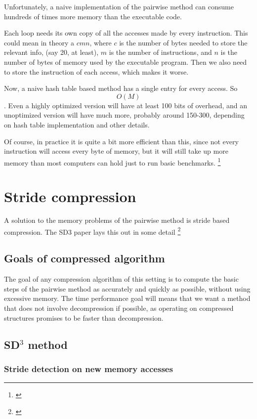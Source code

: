 \documentclass[12pt,twoside]{reedthesis}
\begin{document}
		Unfortunately, a naive implementation of the pairwise method can consume hundreds of times more memory than the executable code.

		Each loop needs its own copy of all the accesses made by every instruction. This could mean in theory a $cmn$, where $c$ is the number of bytes needed to store the relevant info, (say 20, at least), $m$ is the number of instructions, and $n$ is the number of bytes of memory used by the executable program. Then we also need to store the instruction of each access, which makes it worse.
		
		Now, a naive hash table based method has a single entry for every access. 
		So $$O(M)$$. Even a highly optimized version will have at least 100 bits of overhead, and an unoptimized version will have much more, probably around 150-300, depending on hash table implementation and other details. 

		Of course, in practice it is quite a bit more efficient than this, since not every instruction will access every byte of memory, but it will still take up more memory than most computers can hold just to run basic benchmarks. \footnote{\cite{Kim:2010}}

	\section{Stride compression}

		A solution to the memory problems of the pairwise method is stride based compression. The SD3 paper lays this out in some detail \footnote{\cite{Kim:2010}}

		\subsection{Goals of compressed algorithm}
		The goal of any compression algorithm of this setting is to compute the basic steps of the pairwise method as accurately and quickly as possible, without using excessive memory. The time performance goal will means that we want a method that does not involve decompression if possible, as operating on compressed structures promises to be faster than decompression.


		\subsection{SD$^3$ method}

		\subsubsection{Stride detection on new memory accesses}
\end{document}
